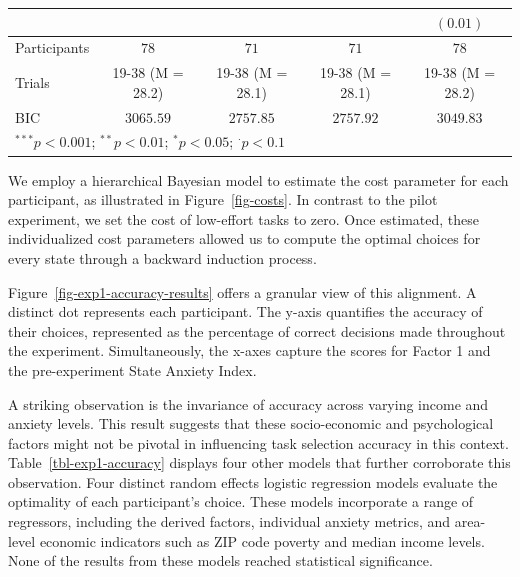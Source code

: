 \documentclass[
]{article}
\begin{document}
\begin{table}
\begin{minipage}[t]{\linewidth}
{\begin{center}
\begin{tabular}{l c c c c}
                       &                  &                  &                  & $(0.01)$         \\
\hline
Participants           & $78$             & $71$             & $71$             & $78$             \\
Trials                 & 19-38 (M = 28.2) & 19-38 (M = 28.1) & 19-38 (M = 28.1) & 19-38 (M = 28.2) \\
BIC                    & $3065.59$        & $2757.85$        & $2757.92$        & $3049.83$        \\
\hline
\multicolumn{5}{l}{\scriptsize{$^{***}p<0.001$; $^{**}p<0.01$; $^{*}p<0.05$; $^{\cdot}p<0.1$}}
\end{tabular}

\label{table:coefficients}
\end{center}

}

\end{minipage}%

\end{table}

We employ a hierarchical Bayesian model to estimate the cost parameter
for each participant, as illustrated in Figure~\ref{fig-costs}. In
contrast to the pilot experiment, we set the cost of low-effort tasks to
zero. Once estimated, these individualized cost parameters allowed us to
compute the optimal choices for every state through a backward induction
process.

Figure~\ref{fig-exp1-accuracy-results} offers a granular view of this
alignment. A distinct dot represents each participant. The y-axis
quantifies the accuracy of their choices, represented as the percentage
of correct decisions made throughout the experiment. Simultaneously, the
x-axes capture the scores for Factor 1 and the pre-experiment State
Anxiety Index.

A striking observation is the invariance of accuracy across varying
income and anxiety levels. This result suggests that these
socio-economic and psychological factors might not be pivotal in
influencing task selection accuracy in this context.
Table~\ref{tbl-exp1-accuracy} displays four other models that further
corroborate this observation. Four distinct random effects logistic
regression models evaluate the optimality of each participant's choice.
These models incorporate a range of regressors, including the derived
factors, individual anxiety metrics, and area-level economic indicators
such as ZIP code poverty and median income levels. None of the results
from these models reached statistical significance.
\end{document}
